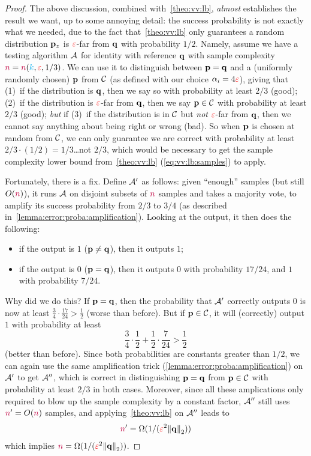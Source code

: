 \begin{proof}
The above discussion, combined with~\cref{theo:vv:lb}, \emph{almost} establishes the result we want, up to some annoying detail: the success probability is not exactly what we needed, due to the fact that~\cref{theo:vv:lb} only guarantees a random distribution $\mathbf{p}_z$ is $\textcolor{red}{\varepsilon}$-far from $\mathbf{q}$ with probability $1/2$. Namely, assume we have a testing algorithm $\mathcal{A}$ for identity with reference $\mathbf{q}$ with sample complexity ${\textcolor{purple}{n}}={\textcolor{purple}{n}}({\textcolor{cyan}{k}},\textcolor{red}{\varepsilon},1/3)$. We can use it to distinguish between $\mathbf{p}=\mathbf{q}$ and a (uniformly randomly chosen) $\mathbf{p}$ from $\mathcal{C}$ (as defined with our choice $\alpha_i = 4\textcolor{red}{\varepsilon}$), giving that
(1)~if the distribution is $\mathbf{q}$, then we say so with probability at least $2/3$ (good);
(2)~if the distribution is $\textcolor{red}{\varepsilon}$-far from $\mathbf{q}$, then we say $\mathbf{p}\in\mathcal{C}$ with probability at least $2/3$ (good);
\emph{but} if (3)~if the distribution is in $\mathcal{C}$ but \emph{not} $\textcolor{red}{\varepsilon}$-far from $\mathbf{q}$, then we cannot say anything about being right or wrong (bad). So when $\mathbf{p}$ is chosen at random from $\mathcal{C}$, we can only guarantee we are correct with probability at least $2/3\cdot (1/2) = 1/3$\dots not $2/3$, which would be necessary to get the sample complexity lower bound from~\cref{theo:vv:lb} (\cref{eq:vv:lb:samples}) to apply.

Fortunately, there is a fix. Define $\mathcal{A}'$ as follows: given ``enough'' samples (but still $O({\textcolor{purple}{n}})$), it runs $\mathcal{A}$ on disjoint subsets of ${\textcolor{purple}{n}}$ samples and takes a majority vote, to amplify its success probability from $2/3$ to $3/4$ (as described in~\cref{lemma:error:proba:amplification}). Looking at the output, it then does the following:
\begin{itemize}
	\item if the output is $1$ ($\mathbf{p}\neq \mathbf{q}$), then it outputs $1$;
	\item if the output is $0$ ($\mathbf{p}=\mathbf{q}$), then it outputs $0$ with probability $17/24$, and $1$ with probability $7/24$.
\end{itemize}
Why did we do this? If $\mathbf{p}=\mathbf{q}$, then the probability that $\mathcal{A}'$ correctly outputs $0$ is now at least
$
\frac{3}{4}\cdot \frac{17}{24} > \frac{1}{2}
$ (worse than before). But if $\mathbf{p}\in\mathcal{C}$, it will (correctly) output $1$ with probability at least
\[
	\frac{3}{4}\cdot \frac{1}{2}+\frac{1}{2}\cdot \frac{7}{24} > \frac{1}{2}
\]
(better than before). Since both probabilities are constants greater than $1/2$, we can again use the same amplification trick (\cref{lemma:error:proba:amplification}) on $\mathcal{A}'$ to get $\mathcal{A}''$, which is correct in distinguishing $\mathbf{p}=\mathbf{q}$ from $\mathbf{p}\in\mathcal{C}$ with probability at least $2/3$ in both cases. Moreover, since all these amplications only required to blow up the sample complexity by a constant factor, $\mathcal{A}''$ still uses ${\textcolor{purple}{n}}' = O({\textcolor{purple}{n}})$ samples, and applying~\cref{theo:vv:lb} on $\mathcal{A}''$ leads to
\[
	\ns' = \Omega(1/(\dst^2\normtwo{\q}))
\]
which implies $\ns = \Omega(1/(\dst^2\normtwo{\q}))$.
\end{proof}
